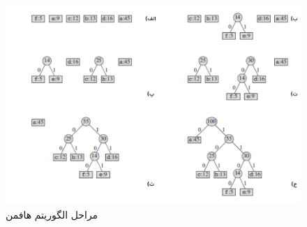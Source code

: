 \begin{figure}[H]
        \centering
        \includegraphics[width=\textwidth]{figs/huffamn_tree.png}
        \caption[مراحل الگوریتم هافمن]{مراحل الگوریتم هافمن \cite{huffman_tree}}
        \label{huffman_tree}
\end{figure}

